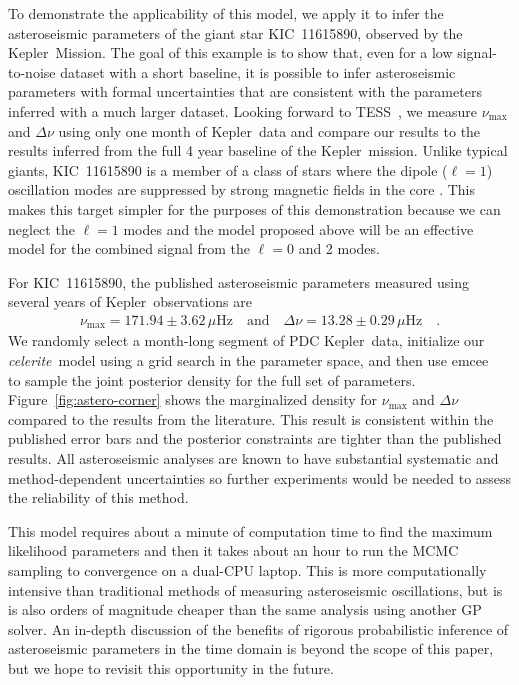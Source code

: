 \documentclass[manuscript, letterpaper]{aastex6}
\newcommand{\project}[1]{\textsf{#1}}
\newcommand{\kepler}{\project{Kepler}}
\newcommand{\tess}{\project{TESS}}
\newcommand{\celeriteterm}{\emph{celerite}}
\newcommand{\emcee}{\project{emcee}}
\newcommand{\figureref}[1]{\ref{fig:#1}}
\newcommand{\Figure}[1]{Figure~\figureref{#1}}
\begin{document}
To demonstrate the applicability of this model, we apply it to infer the
asteroseismic parameters of the giant star KIC~11615890, observed by the
\kepler\ Mission.
The goal of this example is to show that, even for a low signal-to-noise
dataset with a short baseline, it is possible to infer asteroseismic
parameters with formal uncertainties that are consistent with the parameters
inferred with a much larger dataset.
Looking forward to \tess\ \citep{Ricker:2014,Campante:2016}, we measure
$\nu_\mathrm{max}$ and $\Delta\nu$ using only one month of \kepler\ data and
compare our results to the results inferred from the full 4 year baseline of
the \kepler\ mission.
Unlike typical giants, KIC~11615890 is a member of a class of stars where the
dipole ($\ell = 1$) oscillation modes are suppressed by strong magnetic fields
in the core \citep{Stello:2016}.
This makes this target simpler for the purposes of this demonstration because
we can neglect the $\ell = 1$ modes and the model proposed above will be an
effective model for the combined signal from the $\ell = 0$ and 2 modes.

For KIC~11615890, the published asteroseismic parameters measured using several
years of \kepler\ observations are \citep{Pinsonneault:2014}
\begin{eqnarray}
    \nu_\mathrm{max} = 171.94 \pm 3.62 \,\mu\mathrm{Hz} \quad\mathrm{and}\quad
    \Delta\nu = 13.28 \pm 0.29 \,\mu\mathrm{Hz} \quad.
\end{eqnarray}
We randomly select a month-long segment of PDC \citep{Stumpe:2012, Smith:2012}
\kepler\ data, initialize our \celeriteterm\ model using a grid search in the
parameter space, and then use \emcee\ \citep{Foreman-Mackey:2013} to sample
the joint posterior density for the full set of parameters.
\Figure{astero-corner} shows the marginalized density for $\nu_\mathrm{max}$
and $\Delta\nu$ compared to the results from the literature.
This result is consistent within the published error bars and the posterior
constraints are tighter than the published results.
All asteroseismic analyses are known to have substantial systematic and
method-dependent uncertainties \citep{Verner:2011} so further experiments
would be needed to assess the reliability of this method.

This model requires about a minute of computation time to find the maximum
likelihood parameters and then it takes about an hour to run the MCMC sampling
to convergence on a dual-CPU laptop.
This is more computationally intensive than traditional methods of measuring
asteroseismic oscillations, but is is also orders of magnitude cheaper than the
same analysis using another GP solver.
An in-depth discussion of the benefits of rigorous probabilistic inference of
asteroseismic parameters in the time domain is beyond the scope of this paper,
but we hope to revisit this opportunity in the future.
\end{document}
